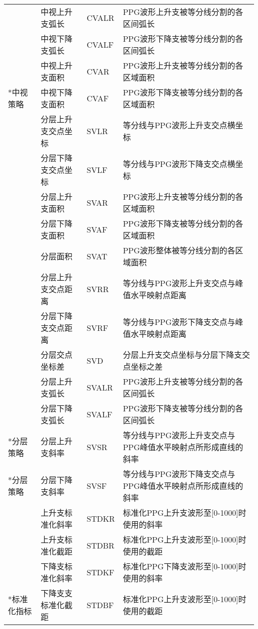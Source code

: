 \begin{center}
\begin{longtable}{m{1.5cm}<{\centering}m{3.5cm}<{\centering}m{2cm}<{\centering}m{8cm}<{\centering}}
         &     中视上升支弧长 & CVALR & PPG波形上升支被等分线分割的各区间弧长 \\
         &     中视下降支弧长 & CVALF & PPG波形下降支被等分线分割的各区间弧长 \\
         &     中视上升支面积 & CVAR & PPG波形上升支被等分线分割的各区域面积 \\
         \multirow{-12}*{中视策略} &     中视下降支面积 & CVAF & PPG波形下降支被等分线分割的各区域面积 \\
         &     分层上升支交点坐标 & SVLR & 等分线与PPG波形上升支交点横坐标 \\
         &     分层下降支交点坐标 & SVLF & 等分线与PPG波形下降支交点横坐标 \\
         &     分层上升支面积 & SVAR & PPG波形上升支被等分线分割的各区域面积 \\
         &     分层下降支面积 & SVAF & PPG波形下降支被等分线分割的各区域面积 \\
         &     分层面积 & SVAT & PPG波形整体被等分线分割的各区域面积 \\
         &     分层上升支交点距离 & SVRR & 等分线与PPG波形上升支交点与峰值水平映射点距离 \\
         &     分层下降支交点距离 & SVRF & 等分线与PPG波形下降支交点与峰值水平映射点距离 \\
         &     分层交点坐标差 & SVD &  分层上升支交点坐标与分层下降支交点坐标之差\\
         &     分层上升支弧长 & SVALR & PPG波形上升支被等分线分割的各区间弧长 \\
         &     分层下降支弧长 & SVALF & PPG波形下降支被等分线分割的各区间弧长 \\
         \multirow{-11}*{分层策略} &     分层上升支斜率 & SVSR & 等分线与PPG波形上升支交点与PPG峰值水平映射点所形成直线的斜率\\
         \multirow{-1}*{分层策略} & 分层下降支斜率 & SVSF & 等分线与PPG波形下降支交点与PPG峰值水平映射点所形成直线的斜率 \\
         &     上升支标准化斜率 & STDKR & 标准化PPG上升支波形至[0-1000]时使用的斜率 \\
         &     上升支标准化截距 & STDBR & 标准化PPG上升支波形至[0-1000]时使用的截距 \\
         &     下降支标准化斜率& STDKF & 标准化PPG下降支波形至[0-1000]时使用的斜率 \\
         \multirow{-4}*{标准化指标}   &  下降支支标准化截距 & STDBF & 标准化PPG上升支波形至[0-1000]时使用的截距 \\
  \end{longtable}
\end{center}
\vspace{-1.2cm} 
